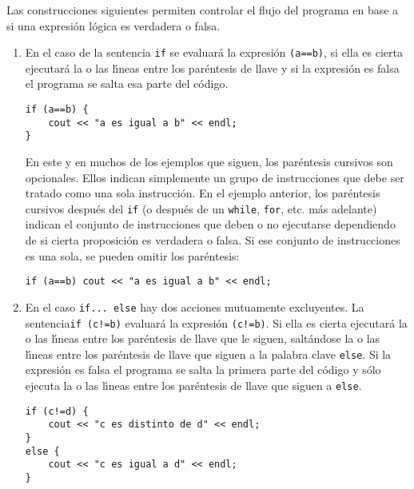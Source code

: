 Las construcciones siguientes permiten controlar el flujo del programa
en base a si una expresi{\'o}n l{\'o}gica es verdadera o falsa. 
\begin{enumerate}
\item[a)] En el caso de la sentencia \verb|if| se evaluar{\'a} la expresi{\'o}n
  \verb|(a==b)|, si ella es cierta ejecutar{\'a} la o las l{\'\i}neas entre los par{\'e}ntesis de
  llave y si la expresi{\'o}n es falsa el  programa se salta esa parte del c{\'o}digo.
\begin{verbatim}
if (a==b) {
    cout << "a es igual a b" << endl;
}
\end{verbatim}
  

En este y en muchos de los ejemplos que siguen, los par\'entesis
cursivos son opcionales. Ellos indican simplemente un grupo de
instrucciones que debe ser tratado como una sola instrucci\'on. En el
ejemplo anterior, los par\'entesis cursivos despu\'es del \verb+if+ (o
despu\'es de un \verb+while+, \verb+for+, etc. m\'as adelante) indican
el conjunto de instrucciones que deben o no ejecutarse dependiendo de
si cierta proposici\'on es verdadera o falsa. Si ese conjunto de
instrucciones es una sola, se pueden omitir los par\'entesis:
\begin{verbatim}
if (a==b) cout << "a es igual a b" << endl;
\end{verbatim}



\item[b)] En el caso \verb|if... else| hay dos acciones mutuamente
  excluyentes. La sentencia\linebreak\verb|if (c!=b)| evaluar{\'a} la expresi{\'o}n
  \verb|(c!=b)|. Si ella es cierta ejecutar{\'a} la o las l{\'\i}neas entre los
  par{\'e}ntesis de llave que le siguen, salt{\'a}ndose la o las l{\'\i}neas entre
  los par{\'e}ntesis de llave que siguen a la palabra clave \verb|else|. 
  Si la expresi{\'o}n es falsa el programa se salta la primera parte del
  c{\'o}digo y s{\'o}lo ejecuta la o las l{\'\i}neas entre los par{\'e}ntesis de llave
  que siguen a \verb|else|.
\begin{verbatim}
if (c!=d) {
    cout << "c es distinto de d" << endl;
} 
else {
    cout << "c es igual a d" << endl;
}
\end{verbatim}
  

\end{enumerate}
